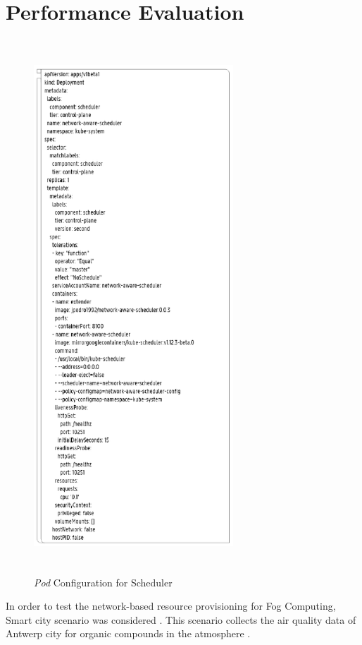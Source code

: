 \section{Performance Evaluation}
\label{sec:Performance_eval}
\begin{figure}
  \centering
  \includegraphics[width=75mm, height=20cm]{figures/mlcn-k8s-pod-config.pdf}
  \caption{\emph{Pod} Configuration for Scheduler\cite{Santos2019}}
  \label{fig:k8s-pod-config}
\end{figure}
In order to test the network-based resource provisioning for Fog Computing, Smart city scenario was considered \cite{Santos2019}. This scenario collects the air quality data of Antwerp city for organic compounds in the atmosphere \cite{Santos2019}.
